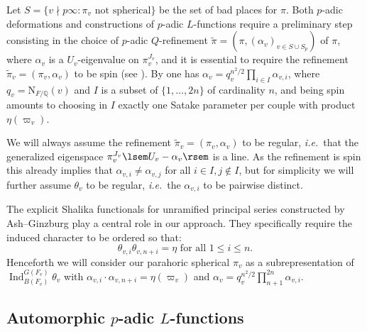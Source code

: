\documentclass{amsart}
\theoremstyle{definition}
\newcommand{\A}{\mathbb{A}}
\newcommand{\Q}{\mathbb{Q}}
\newcommand{\cO}{\mathcal{O}}
\newcommand{\Ind}{\operatorname{Ind}}
\newcommand{\Cl}{\mathscr{C}\!\ell_F^+}
\begin{document}
{Let $S=\{v\nmid p\infty: \pi_v\text{ not spherical}\}$  be the set of bad places for $\pi$. 
Both  $p$-adic deformations and  constructions of $p$-adic $L$-functions  require a preliminary step consisting in the choice of  $p$-adic $Q$-refinement $\widetilde{\pi}=\left(\pi,(\alpha_v)_{v\in S\cup S_p}\right)$ of $\pi$, where $\alpha_v$ is a $U_v$-eigenvalue on $\pi_v^{J_v}$, and it  is essential to require the refinement $\widetilde{\pi}_v=(\pi_v,\alpha_v)$ to be spin (see \cite[\S6]{BDGJW}). By \cite{DJR} one has 
$\alpha_v=q_v^{n^2/2}\prod\limits_{i\in I}\alpha_{v,i}$, where $q_v=\mathrm{N}_{F/\Q}(v)$ and 
$I$ is a subset of  $\{1,\dots, 2n\}$  of cardinality $n$, and being spin amounts to choosing in $I$ exactly one 
Satake parameter per couple with product $\eta(\varpi_v)$. 

We will always assume the refinement $\widetilde{\pi}_v=(\pi_v,\alpha_v)$  to be regular, {\it i.e.} that  the generalized eigenspace $\pi_v^{J_v} \lsem U_v-\alpha_v\rsem$ is a line. As the refinement is spin this already implies that $\alpha_{v,i}\ne \alpha_{v,j}$ for all $i\in I, j\notin I$, but for simplicity we will 
further assume $\theta_v$ to be regular,  {\it i.e.} the $\alpha_{v,i}$ to be pairwise distinct. 

The explicit Shalika functionals for unramified principal series  constructed by Ash--Ginzburg \cite{AG}  play a central role in our approach. 
They specifically require the induced character to be ordered so that: 
\[\theta_{v,i}\theta_{v,n+i}=\eta \text{ for all }  1 \leqslant  i \leqslant n.  \]
Henceforth we will consider our parahoric spherical $\pi_v$ as a subrepresentation of $\Ind_{B(F_v)}^{G(F_v)}\theta_v$ with 
$\alpha_{v,i}\cdot \alpha_{v,n+i}=\eta(\varpi_v)$ and $\alpha_{v}=q_v^{n^2/2}\prod\limits_{n+1}^{2n}\alpha_{v,i}$. 





\subsection{Automorphic $p$-adic $L$-functions}  \label{sec:padicL} 





}
\end{document}
